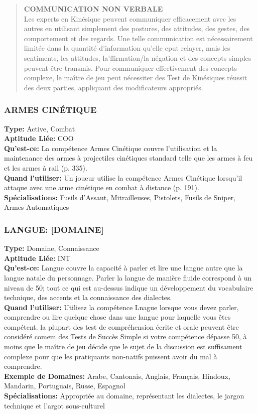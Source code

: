 \begin{quotation} \textbf{COMMUNICATION NON VERBALE} \\ Les experts en Kinésique peuvent communiquer efficacement avec les autres en utilisant simplement des postures, des attitudes, des gestes, des comportement et des regards. Une telle communication est nécessairement limitée dans la quantité d'information qu'elle eput relayer, mais les sentiments, les attitudes, la'ffirmation/la négation et des concepts simples peuvent être transmis. Pour communiquer effectivement des concepts complexe, le maître de jeu peut nécessiter des Test de Kinésiques réussit des deux parties, appliquant des modificateurs appropriés. \end{quotation} 

\subsubsection{ARMES CINÉTIQUE} \textbf{Type:} Active, Combat \\ \textbf{Aptitude Liée:} COO \\ \textbf{Qu'est-ce:} La compétence Armes Cinétique couvre l'utilisation et la maintenance des armes à projectiles cinétiques standard telle que les armes à feu et les armes à rail (p. 335). \\ \textbf{Quand l'utiliser:} Un joueur utilise la compétence Armes Cinétique lorsqu'il attaque avec une arme cinétique en combat à distance (p. 191). \\ \textbf{Spécialisations:} Fusils d'Assaut, Mitrailleuses, Pistolets, Fusils de Sniper, Armes Automatiques 



\subsubsection{LANGUE: [DOMAINE]} \textbf{Type:} Domaine, Connaissance\\ \textbf{Aptitude Liée:} INT \\ \textbf{Qu'est-ce:} Langue couvre la capacité à parler et lire une langue autre que la langue natale du personnage. Parler la langue de manière fluide correspond à un niveau de 50; tout ce qui est au-dessus indique un développement du vocabulaire technique, des accents et la connaissance des dialectes. \\ \textbf{Quand l'utiliser:} Utilisez la compétence Lnague lorsque vous devez parler, comprendre ou lire quelque chose dans une langue pour laquelle vous êtes compétent. la plupart des test de compréhension écrite et orale peuvent être considéré comem des Tests de Succès Simple si votre compétence dépasse 50, à moins que le maître de jeu décide que le sujet de la discussion est suffisament complexe pour que les pratiquants non-natifs puissent avoir du mal à comprendre. \\ \textbf{Exemple de Domaines:} Arabe, Cantonais, Anglais, Français, Hindoux, Mandarin, Portuguais, Russe, Espagnol \\ \textbf{Spécialisations:} Appropriée au domaine, représentant les dialectes, le jargon technique et l'argot sous-culturel 


